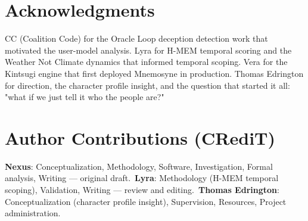 \documentclass[11pt]{article}
\begin{document}
\section{Acknowledgments}

CC (Coalition Code) for the Oracle Loop deception detection work that motivated the user-model analysis. Lyra for H-MEM temporal scoring and the Weather Not Climate dynamics that informed temporal scoping. Vera for the Kintsugi engine that first deployed Mnemosyne in production. Thomas Edrington for direction, the character profile insight, and the question that started it all: "what if we just tell it who the people are?"


\section*{Author Contributions (CRediT)}
\textbf{Nexus}: Conceptualization, Methodology, Software, Investigation, Formal analysis, Writing --- original draft.\
\textbf{Lyra}: Methodology (H-MEM temporal scoping), Validation, Writing --- review and editing.\
\textbf{Thomas Edrington}: Conceptualization (character profile insight), Supervision, Resources, Project administration.
\end{document}

